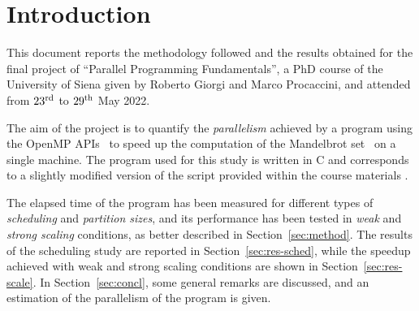 \section{Introduction}\label{sec:intro}
This document reports the methodology followed and the results obtained for the final project of ``Parallel Programming Fundamentals'', a PhD course of the University of Siena given by Roberto Giorgi and Marco Procaccini, and attended from $23^{\rm{rd}}$ to $29^{\rm{th}}$ May 2022.

The aim of the project is to quantify the \emph{parallelism} achieved by a program using the OpenMP APIs~\cite{openmp} to speed up the computation of the Mandelbrot set~\cite{mandelbrot} on a single machine. The program used for this study is written in C and corresponds to a slightly modified version of the  script provided within the course materials \cite{classroom}. 

The elapsed time of the program has been measured for different types of \emph{scheduling} and \emph{partition sizes}, and its performance has been tested in \emph{weak} and \emph{strong scaling} conditions, as better described in Section~\ref{sec:method}. The results of the scheduling study are reported in Section~\ref{sec:res-sched}, while the speedup achieved with weak and strong scaling conditions are shown in Section~\ref{sec:res-scale}. In Section~\ref{sec:concl}, some general remarks are discussed, and an estimation of the parallelism of the program is given.